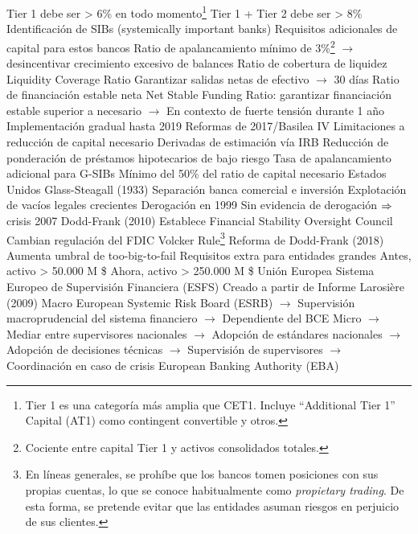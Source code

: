 \documentclass{nuevotema}
\begin{document}
\begin{esquemal}
				\4[$\to$] Tier 1 debe ser > 6\% en todo momento\footnote{Tier 1 es una categoría más amplia que CET1. Incluye ``Additional Tier 1'' Capital (AT1) como contingent convertible y otros.}
				\4[$\to$] Tier 1 + Tier 2 debe ser > 8\%
				\4 Identificación de SIBs (systemically important banks)
				\4[] Requisitos adicionales de capital para estos bancos
				\4 Ratio de apalancamiento
				\4[] mínimo de 3\%\footnote{Cociente entre capital Tier 1 y activos consolidados totales.}
				\4[] $\to$ desincentivar crecimiento excesivo de balances
				\4 Ratio de cobertura de liquidez
				\4[] Liquidity Coverage Ratio
				\4[] Garantizar salidas netas de efectivo
				\4[] $\to$ 30 días
				\4 Ratio de financiación estable neta
				\4[] Net Stable Funding Ratio:
				\4[] garantizar financiación estable superior a necesario
				\4[] $\to$ En contexto de fuerte tensión durante 1 año
				\4 Implementación gradual hasta 2019
			\3 Reformas de 2017/Basilea IV
				\4 Limitaciones a reducción de capital necesario
				\4[] Derivadas de estimación vía IRB
				\4 Reducción de ponderación de préstamos hipotecarios de bajo riesgo
				\4 Tasa de apalancamiento adicional para G-SIBs
				\4[] Mínimo del 50\% del ratio de capital necesario
		\2 Estados Unidos
			\3 Glass-Steagall (1933)
				\4 Separación banca comercial e inversión
				\4 Explotación de vacíos legales crecientes
				\4 Derogación en 1999
				\4 Sin evidencia de derogación $\Rightarrow$ crisis 2007
			\3 Dodd-Frank (2010)
				\4 Establece Financial Stability Oversight Council
				\4 Cambian regulación del FDIC
				\4 Volcker Rule\footnote{En líneas generales, se prohíbe que los bancos tomen posiciones con sus propias cuentas, lo que se conoce habitualmente como \textit{propietary trading}. De esta forma, se pretende evitar que las entidades asuman riesgos en perjuicio de sus clientes.}
			\3 Reforma de Dodd-Frank (2018)
				\4 Aumenta umbral de too-big-to-fail
				\4[] Requisitos extra para entidades grandes
				\4[] Antes, activo > 50.000 M \$
				\4[] Ahora, activo > 250.000 M \$
		\2 Unión Europea
			\3 Sistema Europeo de Supervisión Financiera (ESFS)
				\4 Creado a partir de Informe Larosière (2009)
				\4 Macro
				\4[] European Systemic Risk Board (ESRB)
				\4[] $\to$ Supervisión macroprudencial del sistema financiero
				\4[] $\to$ Dependiente del BCE
				\4 Micro
				\4[] $\to$ Mediar entre supervisores nacionales
				\4[] $\to$ Adopción de estándares nacionales
				\4[] $\to$ Adopción de decisiones técnicas
				\4[] $\to$ Supervisión de supervisores
				\4[] $\to$ Coordinación en caso de crisis
				\4[] European Banking Authority (EBA)

\end{esquemal}
\end{document}

